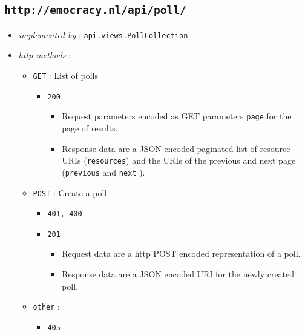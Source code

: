\documentclass[a4paper]{report}
\begin{document}
\subsection{\texttt{http://emocracy.nl/api/poll/}}
\begin{itemize}
    \item{\textsl{implemented by} : \texttt{api.views.PollCollection}}
    \item{\textsl{http methods} :
        \begin{itemize}
            \item{\texttt{GET} : List of polls
                \begin{itemize}
                    \item{\texttt{200}}
                    \begin{itemize}
                        \item{Request parameters encoded as GET parameters 
                        \texttt{page} for the page of results.}
                        \item{Response data are a JSON encoded paginated list of 
                        resource URIs (\texttt{resources}) and the URIs of the 
                        previous and next page (\texttt{previous} and \texttt{next}
                        ).}
                    \end{itemize}
                \end{itemize}
            }
            \item{\texttt{POST} : Create a poll
                \begin{itemize}
                    \item{\texttt{401, 400}}
                    \item{\texttt{201}
                    \begin{itemize}
                        \item{Request data are a http POST encoded 
                        representation of a poll.}
                        \item{Response data are a JSON encoded URI for the newly
                        created poll.}
                    \end{itemize}
                    }
                \end{itemize}
            }
            
            \item{\texttt{other} :
                \begin{itemize}
                    \item{\texttt{405}}
                \end{itemize}
            }
        \end{itemize}
    }
\end{itemize}
\end{document}
